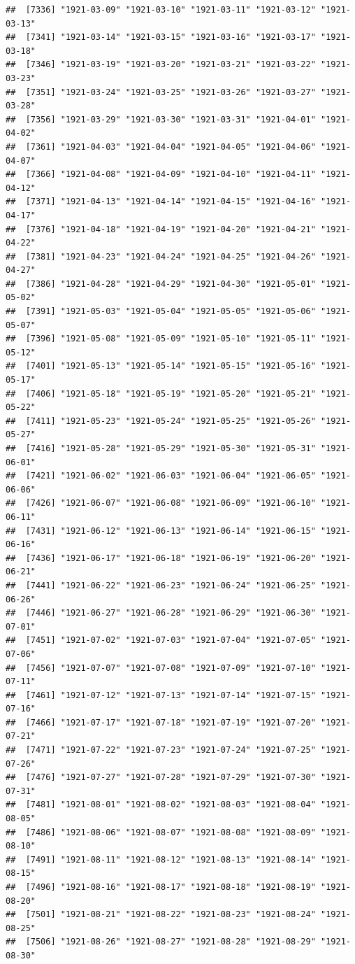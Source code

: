 \documentclass{article}\usepackage[]{graphicx}\usepackage[]{color}
\makeatletter
\newenvironment{kframe}{%
 \def\at@end@of@kframe{}%
 \ifinner\ifhmode%
  \def\at@end@of@kframe{\end{minipage}}%
  \begin{minipage}{\columnwidth}%
 \fi\fi%
 \def\FrameCommand##1{\hskip\@totalleftmargin \hskip-\fboxsep
 \colorbox{shadecolor}{##1}\hskip-\fboxsep
     \hskip-\linewidth \hskip-\@totalleftmargin \hskip\columnwidth}%
 \MakeFramed {\advance\hsize-\width
   \@totalleftmargin\z@ \linewidth\hsize
   \@setminipage}}%
 {\par\unskip\endMakeFramed%
 \at@end@of@kframe}
\newenvironment{knitrout}{}{} %
\makeatother
\begin{document}
\begin{description}
\begin{knitrout}
\begin{kframe}
\begin{verbatim}
##  [7336] "1921-03-09" "1921-03-10" "1921-03-11" "1921-03-12" "1921-03-13"
##  [7341] "1921-03-14" "1921-03-15" "1921-03-16" "1921-03-17" "1921-03-18"
##  [7346] "1921-03-19" "1921-03-20" "1921-03-21" "1921-03-22" "1921-03-23"
##  [7351] "1921-03-24" "1921-03-25" "1921-03-26" "1921-03-27" "1921-03-28"
##  [7356] "1921-03-29" "1921-03-30" "1921-03-31" "1921-04-01" "1921-04-02"
##  [7361] "1921-04-03" "1921-04-04" "1921-04-05" "1921-04-06" "1921-04-07"
##  [7366] "1921-04-08" "1921-04-09" "1921-04-10" "1921-04-11" "1921-04-12"
##  [7371] "1921-04-13" "1921-04-14" "1921-04-15" "1921-04-16" "1921-04-17"
##  [7376] "1921-04-18" "1921-04-19" "1921-04-20" "1921-04-21" "1921-04-22"
##  [7381] "1921-04-23" "1921-04-24" "1921-04-25" "1921-04-26" "1921-04-27"
##  [7386] "1921-04-28" "1921-04-29" "1921-04-30" "1921-05-01" "1921-05-02"
##  [7391] "1921-05-03" "1921-05-04" "1921-05-05" "1921-05-06" "1921-05-07"
##  [7396] "1921-05-08" "1921-05-09" "1921-05-10" "1921-05-11" "1921-05-12"
##  [7401] "1921-05-13" "1921-05-14" "1921-05-15" "1921-05-16" "1921-05-17"
##  [7406] "1921-05-18" "1921-05-19" "1921-05-20" "1921-05-21" "1921-05-22"
##  [7411] "1921-05-23" "1921-05-24" "1921-05-25" "1921-05-26" "1921-05-27"
##  [7416] "1921-05-28" "1921-05-29" "1921-05-30" "1921-05-31" "1921-06-01"
##  [7421] "1921-06-02" "1921-06-03" "1921-06-04" "1921-06-05" "1921-06-06"
##  [7426] "1921-06-07" "1921-06-08" "1921-06-09" "1921-06-10" "1921-06-11"
##  [7431] "1921-06-12" "1921-06-13" "1921-06-14" "1921-06-15" "1921-06-16"
##  [7436] "1921-06-17" "1921-06-18" "1921-06-19" "1921-06-20" "1921-06-21"
##  [7441] "1921-06-22" "1921-06-23" "1921-06-24" "1921-06-25" "1921-06-26"
##  [7446] "1921-06-27" "1921-06-28" "1921-06-29" "1921-06-30" "1921-07-01"
##  [7451] "1921-07-02" "1921-07-03" "1921-07-04" "1921-07-05" "1921-07-06"
##  [7456] "1921-07-07" "1921-07-08" "1921-07-09" "1921-07-10" "1921-07-11"
##  [7461] "1921-07-12" "1921-07-13" "1921-07-14" "1921-07-15" "1921-07-16"
##  [7466] "1921-07-17" "1921-07-18" "1921-07-19" "1921-07-20" "1921-07-21"
##  [7471] "1921-07-22" "1921-07-23" "1921-07-24" "1921-07-25" "1921-07-26"
##  [7476] "1921-07-27" "1921-07-28" "1921-07-29" "1921-07-30" "1921-07-31"
##  [7481] "1921-08-01" "1921-08-02" "1921-08-03" "1921-08-04" "1921-08-05"
##  [7486] "1921-08-06" "1921-08-07" "1921-08-08" "1921-08-09" "1921-08-10"
##  [7491] "1921-08-11" "1921-08-12" "1921-08-13" "1921-08-14" "1921-08-15"
##  [7496] "1921-08-16" "1921-08-17" "1921-08-18" "1921-08-19" "1921-08-20"
##  [7501] "1921-08-21" "1921-08-22" "1921-08-23" "1921-08-24" "1921-08-25"
##  [7506] "1921-08-26" "1921-08-27" "1921-08-28" "1921-08-29" "1921-08-30"

\end{verbatim}
\end{kframe}
\end{knitrout}
\end{description}
\end{document}
